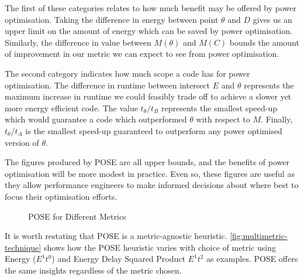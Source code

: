 The first of these categories relates to how much benefit may be offered by power optimisation.
Taking the difference in energy between point $\theta$ and $D$ gives us an upper limit on the amount of energy which can be saved by power optimisation. 
Similarly, the difference in value between $M(\theta)$ and $M(C)$ bounds the amount of improvement in our metric we can expect to see from power optimisation.

The second category indicates how much scope a code has for power optimisation.
The difference in runtime between intersect $E$ and $\theta$ represents the maximum increase in runtime we could feasibly trade off to achieve a slower yet more energy efficient code.
The value $t_\theta / t_B$ represents the smallest speed-up which would guarantee a code which outperformed $\theta$ with respect to $M$.
Finally, $t_\theta / t_A$ is the smallest speed-up guaranteed to outperform any power optimised version of $\theta$.

The figures produced by POSE are all upper bounds, and the benefits of power optimisation will be more modest in practice.
Even so, these figures are useful as they allow performance engineers to make informed decisions about where best to focus their optimisation efforts.

\begin{figure}
\centering

\caption{POSE for Different Metrics}
\label{fig:multimetric-technique}
\end{figure}

It is worth restating that POSE is a metric-agnostic heuristic. \autoref{fig:multimetric-technique} shows how the POSE heuristic varies with choice of metric using Energy ($E^1t^0$) and Energy Delay Squared Product $E^1t^2$ as examples. POSE offers the same insights regardless of the metric chosen.

